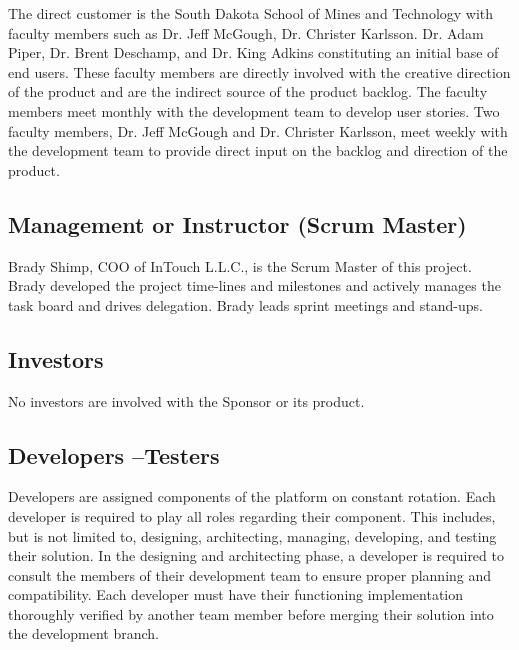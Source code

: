 The direct customer is the South Dakota School of Mines and Technology with faculty members such as Dr. Jeff McGough, Dr. Christer Karlsson. Dr. Adam Piper, Dr. Brent Deschamp, and Dr. King Adkins constituting an initial base of end users. These faculty members are directly involved with the creative direction of the product and are the indirect source of the product backlog. The faculty members meet monthly with the development team to develop user stories. Two faculty members, Dr. Jeff McGough and Dr. Christer Karlsson, meet weekly with the development team to provide direct input on the backlog and direction of the product. 

\subsection{Management or Instructor (Scrum Master)}

Brady Shimp, COO of InTouch L.L.C., is the Scrum Master of this project. Brady developed the project time-lines and milestones and actively manages the task board and drives delegation. Brady leads sprint meetings and stand-ups. 


\subsection{Investors}

No investors are involved with the Sponsor or its product. 

\subsection{Developers --Testers}

Developers are assigned components of the platform on constant rotation. Each developer is required to play all roles regarding their component. This includes, but is not limited to, designing, architecting, managing, developing, and testing their solution. In the designing and architecting phase, a developer is required to consult the members of their development team to ensure proper planning and compatibility. Each developer must have their functioning implementation thoroughly verified by another team member before merging their solution into the development branch. 

